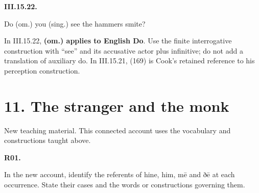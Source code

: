 \par\begin{minipage}{\linewidth}\raggedright
\textbf{III.15.22.}

Do (om.) you (sing.) see the hammers smite?

In III.15.22, \textbf{(om.) applies to English Do}. Use the finite interrogative construction with “see” and its accusative actor plus infinitive; do not add a translation of auxiliary do. In III.15.21, (169) is Cook's retained reference to his perception construction.

\end{minipage}\par\addvspace{4pt}

\section*{11. The stranger and the monk}

New teaching material. This connected account uses the vocabulary and constructions taught above.

\par\begin{minipage}{\linewidth}\raggedright
{}
\end{minipage}\par

\par\begin{minipage}{\linewidth}\raggedright
\textbf{R01.}

In the new account, identify the referents of hine, him, mē and ðē at each occurrence. State their cases and the words or constructions governing them.

\end{minipage}\par\addvspace{4pt}

